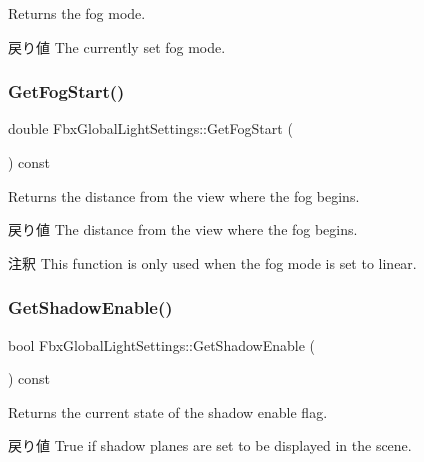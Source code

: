 Returns the fog mode. \begin{DoxyReturn}{戻り値}
The currently set fog mode. 
\end{DoxyReturn}
\mbox{\label{class_fbx_global_light_settings_a36162af4c56d06d37ce07ebd7a4d52a6}} 
\subsubsection{\texorpdfstring{Get\+Fog\+Start()}{GetFogStart()}}
{\footnotesize\ttfamily double Fbx\+Global\+Light\+Settings\+::\+Get\+Fog\+Start (\begin{DoxyParamCaption}{ }\end{DoxyParamCaption}) const}

Returns the distance from the view where the fog begins. \begin{DoxyReturn}{戻り値}
The distance from the view where the fog begins. 
\end{DoxyReturn}
\begin{DoxyRemark}{注釈}
This function is only used when the fog mode is set to linear. 
\end{DoxyRemark}
\mbox{\label{class_fbx_global_light_settings_afd139497270cca9fd2deaa03e2ec1fe7}} 
\subsubsection{\texorpdfstring{Get\+Shadow\+Enable()}{GetShadowEnable()}}
{\footnotesize\ttfamily bool Fbx\+Global\+Light\+Settings\+::\+Get\+Shadow\+Enable (\begin{DoxyParamCaption}{ }\end{DoxyParamCaption}) const}

Returns the current state of the shadow enable flag. \begin{DoxyReturn}{戻り値}
{\ttfamily True} if shadow planes are set to be displayed in the scene. 
\end{DoxyReturn}
\mbox{\label{class_fbx_global_light_settings_a86101dda291ce7b103a7fe77ecb0a876}} 
